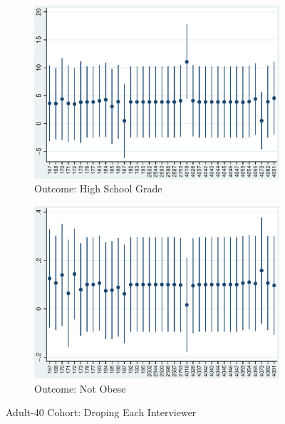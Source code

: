    \begin{figure}[H]
      \centering
        \begin{subfigure}[t]{0.75\textwidth}
          \includegraphics[width=\textwidth]{../../../output/image/coef-interviewer-adult40-votoMaturita_PmDiD.eps}       
\caption{Outcome: High School Grade}        
        \end{subfigure}
        \begin{subfigure}[t]{0.75\textwidth}
          \includegraphics[width=\textwidth]{../../../output/image/coef-interviewer-adult40-BMI_obese_PmDiD.eps}       
 \caption{Outcome: Not Obese}        
        \end{subfigure}
      \caption{Adult-40 Cohort: Droping Each Interviewer}  \label{fig:adult40-sensitivity-interviewer_PmDiD}
    \end{figure}



